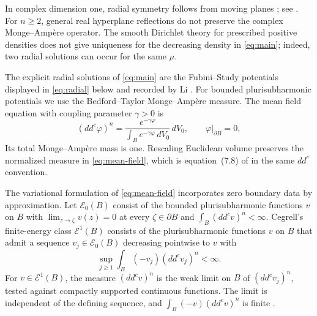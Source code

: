 \documentclass[11pt]{article}
\begin{document}
In complex dimension one, radial symmetry follows from moving
planes \cite{GNN1979}; see \cite[Section~7.3]{BB2022}.
For $n\ge2$, general real hyperplane reflections do not preserve
the complex Monge--Amp\`ere operator. The smooth Dirichlet theory
for prescribed positive densities \cite{CKNS1985} does not give
uniqueness for the decreasing density in \eqref{eq:main}; indeed,
two radial solutions can occur for the same $\mu$.


The explicit radial solutions of \eqref{eq:main} are the Fubini--Study
potentials displayed in \eqref{eq:radial} below and recorded by Li
\cite{Li2016}.
 For bounded plurisubharmonic potentials we use the
Bedford--Taylor Monge--Amp\`ere measure. The mean field equation with
coupling parameter $\gamma>0$ is
\begin{equation}\label{eq:mean-field}
 (dd^c\varphi)^n
 =\frac{e^{-\gamma\varphi}}{\int_Be^{-\gamma\varphi}\,dV_0}\,dV_0,
 \qquad \varphi|_{\partial B}=0,
\end{equation}
Its total Monge--Amp\`ere mass is one.
Rescaling Euclidean volume preserves the normalized measure in
\eqref{eq:mean-field}, which is equation~(7.8) of \cite{BB2022} in the
same $dd^c$ convention.

The variational formulation of \eqref{eq:mean-field} incorporates
zero boundary data by approximation. Let $\mathcal E_0(B)$
consist of the bounded plurisubharmonic functions
$v$ on $B$ with $\lim_{z\to\zeta}v(z)=0$ at every $\zeta\in\partial B$
and $\int_B(dd^cv)^n<\infty$. Cegrell's finite-energy class
$\mathcal E^1(B)$ consists of the plurisubharmonic functions $v$ on $B$
that admit a sequence $v_j\in\mathcal E_0(B)$ decreasing pointwise to
$v$ with
$$
 \sup_{j\ge1}\int_B(-v_j)(dd^cv_j)^n<\infty.
$$
For $v\in\mathcal E^1(B)$, the measure $(dd^cv)^n$ is the weak limit
on $B$ of $(dd^cv_j)^n$, tested against compactly supported continuous
functions. The limit is independent of the defining sequence, and
$\int_B(-v)(dd^cv)^n$ is finite
\cite[Section~2 and Theorems~3.5 and~3.8]{Cegrell1998}.
\end{document}
